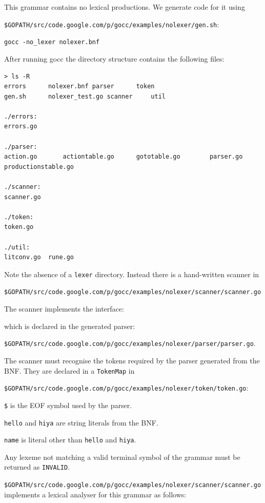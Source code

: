 \documentclass[12pt]{article}
\begin{document}
    This grammar contains no lexical productions. We generate code for it using 

    \verb|$GOPATH/src/code.google.com/p/gocc/examples/nolexer/gen.sh|:

    \verb|gocc -no_lexer nolexer.bnf|

    After running gocc the directory structure contains the following files:
    \begin{verbatim}
> ls -R
errors		nolexer.bnf	parser		token
gen.sh		nolexer_test.go	scanner		util

./errors:
errors.go

./parser:
action.go		actiontable.go		gototable.go		parser.go		productionstable.go

./scanner:
scanner.go

./token:
token.go

./util:
litconv.go	rune.go
    \end{verbatim}

    Note the absence of a \verb|lexer| directory. Instead there is a hand-written scanner in 

    \verb|$GOPATH/src/code.google.com/p/gocc/examples/nolexer/scanner/scanner.go|

    The scanner implements the interface:

    

    which is declared in the generated parser:

    \verb|$GOPATH/src/code.google.com/p/gocc/examples/nolexer/parser/parser.go|.

    The scanner must recognise the tokens required by the parser generated from the BNF. They are declared in a \verb|TokenMap| in 

    \verb|$GOPATH/src/code.google.com/p/gocc/examples/nolexer/token/token.go|:

    

    \verb|$| is the EOF symbol used by the parser.

    \verb|hello| and \verb|hiya| are string literals from the BNF.

    \verb|name| is literal other than \verb|hello| and \verb|hiya|.

    Any lexeme not matching a valid terminal symbol of the grammar must be returned as \verb|INVALID|.

    \verb|$GOPATH/src/code.google.com/p/gocc/examples/nolexer/scanner/scanner.go| implements a lexical analyser for this grammar as follows:
\end{document}
